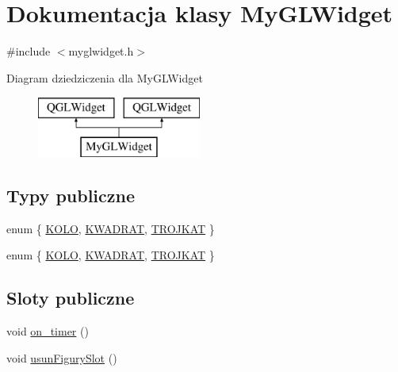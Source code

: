 \hypertarget{classMyGLWidget}{\section{Dokumentacja klasy My\-G\-L\-Widget}
\label{classMyGLWidget}
}


{\ttfamily \#include $<$myglwidget.\-h$>$}

Diagram dziedziczenia dla My\-G\-L\-Widget\begin{figure}[H]
\begin{center}
\leavevmode
\includegraphics[height=2.000000cm]{d0/da8/classMyGLWidget}
\end{center}
\end{figure}
\subsection*{Typy publiczne}
\begin{DoxyCompactItemize}
\item 
enum \{ \hyperlink{classMyGLWidget_a349b4124c85266bef75a190246dca82eafafafccf4bbe772769c94573d5f3101e}{K\-O\-L\-O}, 
\hyperlink{classMyGLWidget_a349b4124c85266bef75a190246dca82ea83219b17f1da7d6ff531f1f616f1f497}{K\-W\-A\-D\-R\-A\-T}, 
\hyperlink{classMyGLWidget_a349b4124c85266bef75a190246dca82ead114f07fe7235d3994ecc8e8270ffbdf}{T\-R\-O\-J\-K\-A\-T}
 \}
\item 
enum \{ \hyperlink{classMyGLWidget_a349b4124c85266bef75a190246dca82eafafafccf4bbe772769c94573d5f3101e}{K\-O\-L\-O}, 
\hyperlink{classMyGLWidget_a349b4124c85266bef75a190246dca82ea83219b17f1da7d6ff531f1f616f1f497}{K\-W\-A\-D\-R\-A\-T}, 
\hyperlink{classMyGLWidget_a349b4124c85266bef75a190246dca82ead114f07fe7235d3994ecc8e8270ffbdf}{T\-R\-O\-J\-K\-A\-T}
 \}
\end{DoxyCompactItemize}
\subsection*{Sloty publiczne}
\begin{DoxyCompactItemize}
\item 
void \hyperlink{classMyGLWidget_ad0fe9c70e007c3ff7365083a9a4586ff}{on\-\_\-timer} ()
\item 
void \hyperlink{classMyGLWidget_ae42f967e5429aed3210ecffbe68ed537}{usun\-Figury\-Slot} ()
\end{DoxyCompactItemize}

